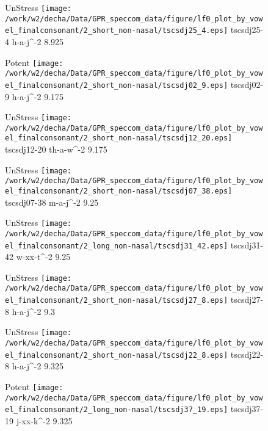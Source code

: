 \documentclass{article}
\begin{document}
\begin{figure}[t]
\begin{minipage}[b]{.24\textwidth}
UnStress
\centering
\texttt{[image: /work/w2/decha/Data/GPR\_speccom\_data/figure/lf0\_plot\_by\_vowel\_finalconsonant/2\_short\_non-nasal/tscsdj25\_4.eps]}
tscsdj25-4 h-a-j\textasciicircum-2 8.925
\end{minipage}
\begin{minipage}[b]{.24\textwidth}
\colorbox{Apricot}{Potent}
\centering
\texttt{[image: /work/w2/decha/Data/GPR\_speccom\_data/figure/lf0\_plot\_by\_vowel\_finalconsonant/2\_short\_non-nasal/tscsdj02\_9.eps]}
tscsdj02-9 h-a-j\textasciicircum-2 9.175
\end{minipage}
\begin{minipage}[b]{.24\textwidth}
UnStress
\centering
\texttt{[image: /work/w2/decha/Data/GPR\_speccom\_data/figure/lf0\_plot\_by\_vowel\_finalconsonant/2\_short\_non-nasal/tscsdj12\_20.eps]}
tscsdj12-20 th-a-w\textasciicircum-2 9.175
\end{minipage}
\begin{minipage}[b]{.24\textwidth}
UnStress
\centering
\texttt{[image: /work/w2/decha/Data/GPR\_speccom\_data/figure/lf0\_plot\_by\_vowel\_finalconsonant/2\_short\_non-nasal/tscsdj07\_38.eps]}
tscsdj07-38 m-a-j\textasciicircum-2 9.25
\end{minipage}
\end{figure}

\begin{figure}[t]
\begin{minipage}[b]{.24\textwidth}
UnStress
\centering
\texttt{[image: /work/w2/decha/Data/GPR\_speccom\_data/figure/lf0\_plot\_by\_vowel\_finalconsonant/2\_long\_non-nasal/tscsdj31\_42.eps]}
tscsdj31-42 w-xx-t\textasciicircum-2 9.25
\end{minipage}
\begin{minipage}[b]{.24\textwidth}
UnStress
\centering
\texttt{[image: /work/w2/decha/Data/GPR\_speccom\_data/figure/lf0\_plot\_by\_vowel\_finalconsonant/2\_short\_non-nasal/tscsdj27\_8.eps]}
tscsdj27-8 h-a-j\textasciicircum-2 9.3
\end{minipage}
\begin{minipage}[b]{.24\textwidth}
UnStress
\centering
\texttt{[image: /work/w2/decha/Data/GPR\_speccom\_data/figure/lf0\_plot\_by\_vowel\_finalconsonant/2\_short\_non-nasal/tscsdj22\_8.eps]}
tscsdj22-8 h-a-j\textasciicircum-2 9.325
\end{minipage}
\begin{minipage}[b]{.24\textwidth}
\colorbox{Apricot}{Potent}
\centering
\texttt{[image: /work/w2/decha/Data/GPR\_speccom\_data/figure/lf0\_plot\_by\_vowel\_finalconsonant/2\_long\_non-nasal/tscsdj37\_19.eps]}
tscsdj37-19 j-xx-k\textasciicircum-2 9.325
\end{minipage}
\end{figure}
\end{document}
